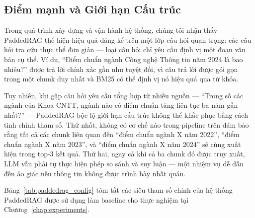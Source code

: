 \documentclass[12pt,a4paper]{report}
\theoremstyle{plain}
\theoremstyle{definition}
\begin{document}
	\subsection{Điểm mạnh và Giới hạn Cấu trúc}
	\label{subsec:paddedrag_limits}

	Trong quá trình xây dựng và vận hành hệ thống, chúng tôi nhận thấy PaddedRAG
	thể hiện hiệu quả đáng kể trên một lớp câu hỏi quan trọng: các câu hỏi tra
	cứu thực thể đơn giản --- loại câu hỏi chỉ yêu cầu định vị một đoạn văn bản
	cụ thể. Ví dụ, ``Điểm chuẩn ngành Công nghệ Thông tin năm 2024 là bao nhiêu?''
	được trả lời chính xác gần như tuyệt đối, vì câu trả lời được gói gọn trong
	một chunk duy nhất và BM25 có thể định vị nó hiệu quả qua từ khóa.

	Tuy nhiên, khi gặp câu hỏi yêu cầu tổng hợp từ nhiều nguồn --- ``Trong số
	các ngành của Khoa CNTT, ngành nào có điểm chuẩn tăng liên tục ba năm gần
	nhất?'' --- PaddedRAG bộc lộ giới hạn cấu trúc không thể khắc phục bằng
	cách tinh chỉnh tham số. Thứ nhất, không có cơ chế nào trong pipeline
	trên đảm bảo rằng tất cả các chunk liên quan đến ``điểm chuẩn ngành X năm
	2022'', ``điểm chuẩn ngành X năm 2023'', và ``điểm chuẩn ngành X năm 2024''
	sẽ cùng xuất hiện trong top-3 kết quả. Thứ hai, ngay cả khi cả ba chunk đó
	được truy xuất, LLM vẫn phải tự thực hiện phép so sánh và suy luận --- một
	nhiệm vụ dễ dẫn đến ảo giác nếu thông tin không được trình bày nhất quán.

	Bảng~\ref{tab:paddedrag_config} tóm tắt các siêu tham số chính của hệ thống
	PaddedRAG được sử dụng làm baseline cho thực nghiệm tại Chương~\ref{chap:experiments}.
\end{document}
